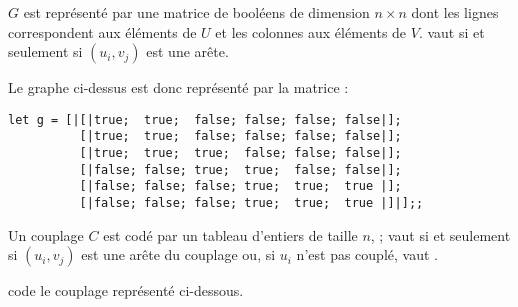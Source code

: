 $G$ est représenté par une matrice de booléens  de dimension $n\times n$ dont les lignes correspondent aux éléments de $U$ et les colonnes aux éléments de $V$.  vaut  si et seulement si $(u_i, v_j)$ est une arête. 

\begin{center}
\end{center}

Le graphe ci-dessus est donc représenté par la matrice :
\begin{lstlisting}
let g = [|[|true;  true;  false; false; false; false|];
          [|true;  true;  false; false; false; false|];
          [|true;  true;  true;  false; false; false|];
          [|false; false; true;  true;  false; false|];
          [|false; false; false; true;  true;  true |];
          [|false; false; false; true;  true;  true |]|];;
\end{lstlisting}
Un couplage $C$ est codé par un tableau d'entiers de taille $n$,  ;  vaut  si et seulement si $(u_i, v_j)$ est une arête du couplage ou, si $u_i$ n'est pas couplé,  vaut .

\type{[|0; 1; -1; 2; 3; 5|]} code le couplage représenté ci-dessous.


